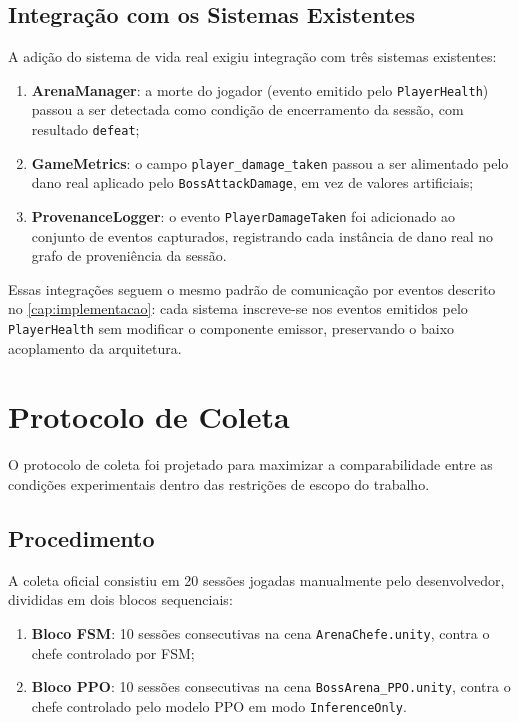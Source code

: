 \subsection{Integração com os Sistemas Existentes}
\label{subsec:integracao-sistemas}

A adição do sistema de vida real exigiu integração com três sistemas
existentes:

\begin{enumerate}
    \item \textbf{ArenaManager}: a morte do jogador (evento emitido pelo
          \texttt{PlayerHealth}) passou a ser detectada como condição de
          encerramento da sessão, com resultado \texttt{defeat};
    \item \textbf{GameMetrics}: o campo \texttt{player\_damage\_taken} passou
          a ser alimentado pelo dano real aplicado pelo
          \texttt{BossAttackDamage}, em vez de valores artificiais;
    \item \textbf{ProvenanceLogger}: o evento \texttt{PlayerDamageTaken} foi
          adicionado ao conjunto de eventos capturados, registrando cada
          instância de dano real no grafo de proveniência da sessão.
\end{enumerate}

Essas integrações seguem o mesmo padrão de comunicação por eventos descrito
no \autoref{cap:implementacao}: cada sistema inscreve-se nos eventos emitidos
pelo \texttt{PlayerHealth} sem modificar o componente emissor, preservando o
baixo acoplamento da arquitetura.

\section{Protocolo de Coleta}
\label{sec:protocolo-coleta}

O protocolo de coleta foi projetado para maximizar a comparabilidade entre as
condições experimentais dentro das restrições de escopo do trabalho.

\subsection{Procedimento}
\label{subsec:procedimento}

A coleta oficial consistiu em 20 sessões jogadas manualmente pelo
desenvolvedor, divididas em dois blocos sequenciais:

\begin{enumerate}
    \item \textbf{Bloco FSM}: 10 sessões consecutivas na cena
          \texttt{ArenaChefe.unity}, contra o chefe controlado por FSM;
    \item \textbf{Bloco PPO}: 10 sessões consecutivas na cena
          \texttt{BossArena\_PPO.unity}, contra o chefe controlado pelo
          modelo PPO em modo \texttt{InferenceOnly}.
\end{enumerate}

